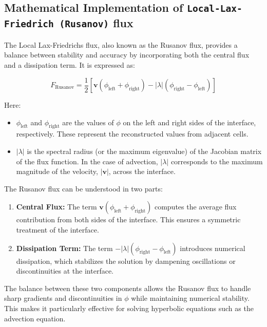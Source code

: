 \documentclass[a4paper, 12pt]{article}
\begin{document}
\subsection{Mathematical Implementation of \texttt{Local-Lax-Friedrich (Rusanov)} flux}

The Local Lax-Friedrichs flux, also known as the Rusanov flux, provides a balance between stability and accuracy by incorporating both the central flux and a dissipation term. It is expressed as: \label{sec:rusanov}

\begin{equation}
F_{\text{Rusanov}} = \frac{1}{2} \left[ \mathbf{v} (\phi_{\text{left}} + \phi_{\text{right}}) - |\lambda| (\phi_{\text{right}} - \phi_{\text{left}}) \right]
\end{equation} \par

Here:
\begin{itemize}
    \item $\phi_{\text{left}}$ and $\phi_{\text{right}}$ are the values of $\phi$ on the left and right sides of the interface, respectively. These represent the reconstructed values from adjacent cells.
    \item $|\lambda|$ is the spectral radius (or the maximum eigenvalue) of the Jacobian matrix of the flux function. In the case of advection, $|\lambda|$ corresponds to the maximum magnitude of the velocity, $|\mathbf{v}|$, across the interface.
\end{itemize} \par

The Rusanov flux can be understood in two parts:
\begin{enumerate}
    \item \textbf{Central Flux:} The term $\mathbf{v} (\phi_{\text{left}} + \phi_{\text{right}})$ computes the average flux contribution from both sides of the interface. This ensures a symmetric treatment of the interface.
    \item \textbf{Dissipation Term:} The term $-|\lambda| (\phi_{\text{right}} - \phi_{\text{left}})$ introduces numerical dissipation, which stabilizes the solution by dampening oscillations or discontinuities at the interface.
\end{enumerate}

The balance between these two components allows the Rusanov flux to handle sharp gradients and discontinuities in $\phi$ while maintaining numerical stability. This makes it particularly effective for solving hyperbolic equations such as the advection equation.
\end{document}
